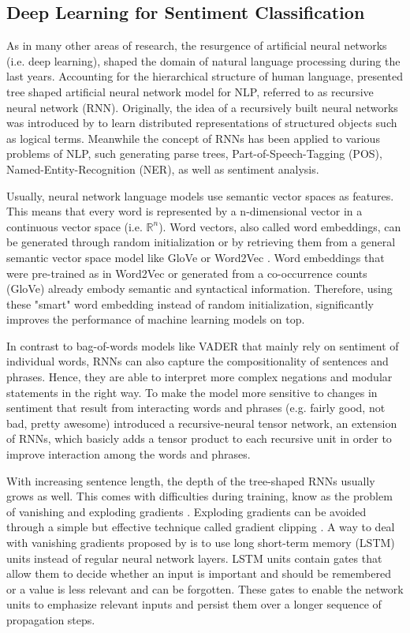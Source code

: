 \documentclass[a4paper,12pt]{article}%
\begin{document}
\subsection{Deep Learning for Sentiment Classification}
As in many other areas of research, the resurgence of artificial neural networks (i.e. deep learning), shaped the domain of natural language processing during the last years. Accounting for the hierarchical structure of human language, \citet{Socher2010} presented tree shaped artificial neural network model for NLP, referred to as recursive neural network (RNN). Originally, the idea of a recursively built neural networks was introduced by \citet{Goller1996} to learn distributed representations of structured objects such as logical terms. Meanwhile the concept of RNNs has been applied to various problems of NLP, such generating parse trees, Part-of-Speech-Tagging (POS), Named-Entity-Recognition (NER), as well as sentiment analysis. 

Usually, neural network language models use semantic vector spaces as features. This means that every word is represented by a n-dimensional vector in a continuous vector space (i.e. $\mathbb{R}^n$). Word vectors, also called word embeddings, can be generated through random initialization or by retrieving them from a general semantic vector space model like GloVe \citep{Pennington2014} or Word2Vec \citep{Mikolov2013}. Word embeddings that were pre-trained as in Word2Vec or generated from a co-occurrence counts (GloVe) already embody semantic and syntactical information. Therefore, using these "smart" word embedding instead of random initialization, significantly improves the performance of machine learning models on top.

In contrast to bag-of-words models like VADER that mainly rely on sentiment of individual words, RNNs can also capture the compositionality of sentences and phrases. Hence, they are able to interpret more complex negations and modular statements in the right way. To make the model more sensitive to changes in sentiment that result from interacting words and phrases (e.g. fairly good, not bad, pretty awesome) \citet{Socher2013} introduced a recursive-neural tensor network, an extension of RNNs, which basicly adds a tensor product to each recursive unit in order to improve interaction among the words and phrases.

With increasing sentence length, the depth of the tree-shaped RNNs usually grows as well. This comes with difficulties during training, know as the problem of vanishing and exploding gradients \citep{Bengio1994}. Exploding gradients can be avoided through a simple but effective technique called gradient clipping \citep{Pascanu2013}. A way to deal with vanishing gradients proposed by \citet{Hochreiter1998} is to use long short-term memory (LSTM) units instead of regular neural network layers. LSTM units contain gates that allow them to decide whether an input is important and should be remembered or a value is less relevant and can be forgotten. These gates to enable the network units to emphasize relevant inputs and persist them over a longer sequence of propagation steps.
\end{document}
